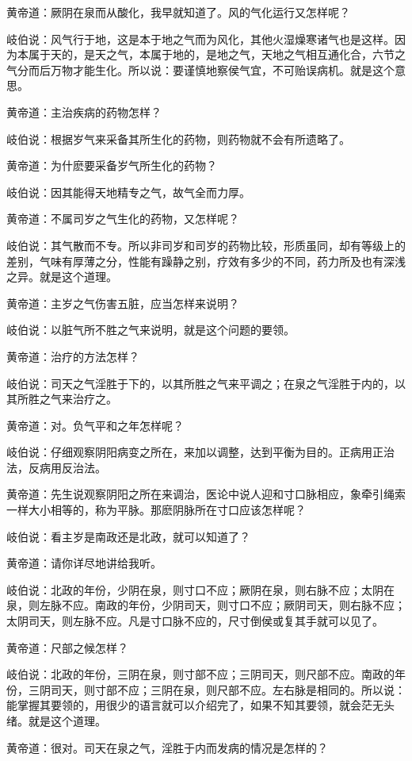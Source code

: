 \documentclass[a4paper,12pt,UTF8,twoside]{ctexbook}
\begin{document}
黄帝道：厥阴在泉而从酸化，我早就知道了。风的气化运行又怎样呢？

岐伯说：风气行于地，这是本于地之气而为风化，其他火湿燥寒诸气也是这样。因为本属于天的，是天之气，本属于地的，是地之气，天地之气相互通化合，六节之气分而后万物才能生化。所以说：要谨慎地察侯气宜，不可贻误病机。就是这个意思。

黄帝道：主治疾病的药物怎样？

岐伯说：根据岁气来采备其所生化的药物，则药物就不会有所遗略了。

黄帝道：为什麽要采备岁气所生化的药物？

岐伯说：因其能得天地精专之气，故气全而力厚。

黄帝道：不属司岁之气生化的药物，又怎样呢？

岐伯说：其气散而不专。所以非司岁和司岁的药物比较，形质虽同，却有等级上的差别，气味有厚薄之分，性能有躁静之别，疗效有多少的不同，药力所及也有深浅之异。就是这个道理。

黄帝道：主岁之气伤害五脏，应当怎样来说明？

岐伯说：以脏气所不胜之气来说明，就是这个问题的要领。

黄帝道：治疗的方法怎样？

岐伯说：司天之气淫胜于下的，以其所胜之气来平调之；在泉之气淫胜于内的，以其所胜之气来治疗之。

黄帝道：对。负气平和之年怎样呢？

岐伯说：仔细观察阴阳病变之所在，来加以调整，达到平衡为目的。正病用正治法，反病用反治法。

黄帝道：先生说观察阴阳之所在来调治，医论中说人迎和寸口脉相应，象牵引绳索一样大小相等的，称为平脉。那麽阴脉所在寸口应该怎样呢？

岐伯说：看主岁是南政还是北政，就可以知道了？

黄帝道：请你详尽地讲给我听。

岐伯说：北政的年份，少阴在泉，则寸口不应；厥阴在泉，则右脉不应；太阴在泉，则左脉不应。南政的年份，少阴司天，则寸口不应；厥阴司天，则右脉不应；太阴司天，则左脉不应。凡是寸口脉不应的，尺寸倒侯或复其手就可以见了。

黄帝道：尺部之候怎样？

岐伯说：北政的年份，三阴在泉，则寸部不应；三阴司天，则尺部不应。南政的年份，三阴司天，则寸部不应；三阴在泉，则尺部不应。左右脉是相同的。所以说：能掌握其要领的，用很少的语言就可以介绍完了，如果不知其要领，就会茫无头绪。就是这个道理。

黄帝道：很对。司天在泉之气，淫胜于内而发病的情况是怎样的？
\end{document}
